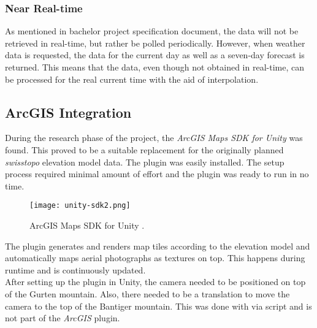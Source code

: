 \subsubsection{Near Real-time}
As mentioned in bachelor project specification document, the data will not be retrieved in real-time, but rather be polled periodically.
However, when weather data is requested, the data for the current day as well as a seven-day forecast is returned.
This means that the data, even though not obtained in real-time, can be processed for the real current time with the aid of \gls{interpolation}.

\subsection{ArcGIS Integration}
\label{section:techimpl:arcgis}
During the research phase of the project, the \emph{ArcGIS Maps SDK for Unity} \cite{arcgis:unitysdk} was found. This proved to be a suitable replacement for the originally planned \emph{swisstopo} elevation model data.
The plugin was easily installed. The setup process required minimal amount of effort and the plugin was ready to run in no time. 

\begin{figure}[H]
    \texttt{[image: unity-sdk2.png]}
    \caption{ArcGIS Maps SDK for Unity \protect\cite{arcgis:unitysdk}.}
\end{figure}

\noindent
The plugin generates and renders map tiles according to the elevation model and automatically maps aerial photographs as textures on top.
This happens during runtime and is continuously updated.
\\
After setting up the plugin in Unity, the camera needed to be positioned on top of the Gurten mountain. Also, there needed to be a translation to move the camera to the top of the Bantiger mountain.
This was done with via script and is not part of the \emph{ArcGIS} plugin.

